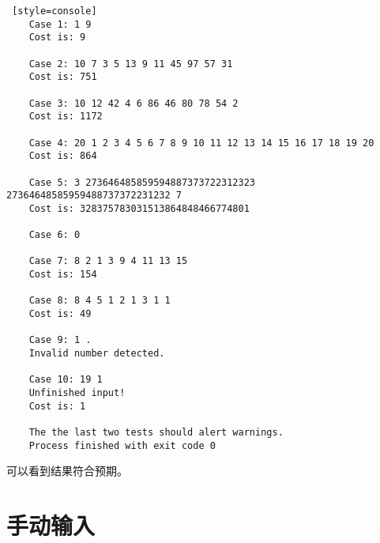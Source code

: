 \begin{lstlisting} [style=console]
    Case 1: 1 9
    Cost is: 9
    
    Case 2: 10 7 3 5 13 9 11 45 97 57 31
    Cost is: 751
    
    Case 3: 10 12 42 4 6 86 46 80 78 54 2
    Cost is: 1172
    
    Case 4: 20 1 2 3 4 5 6 7 8 9 10 11 12 13 14 15 16 17 18 19 20
    Cost is: 864
    
    Case 5: 3 273646485859594887373722312323 27364648585959488737372231232 7
    Cost is: 328375783031513864848466774801
    
    Case 6: 0 
    
    Case 7: 8 2 1 3 9 4 11 13 15
    Cost is: 154
    
    Case 8: 8 4 5 1 2 1 3 1 1
    Cost is: 49
    
    Case 9: 1 .
    Invalid number detected.
    
    Case 10: 19 1
    Unfinished input!
    Cost is: 1
    
    The the last two tests should alert warnings.
    Process finished with exit code 0    
\end{lstlisting}

可以看到结果符合预期。


\section{手动输入}

